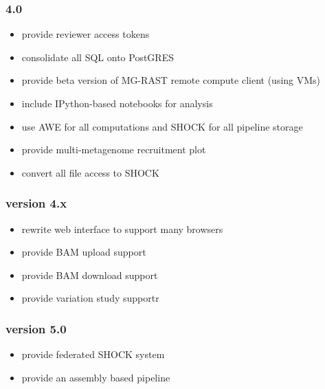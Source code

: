 \documentclass[12pt,fullpage]{report}
\begin{document}
\subsubsection*{4.0}
\begin{itemize}
\item provide reviewer access tokens
\item consolidate all SQL onto PostGRES
\item provide beta version of MG-RAST remote compute client (using VMs)
\item include IPython-based notebooks for analysis
\item use AWE for all computations and SHOCK for all pipeline storage
\item provide multi-metagenome recruitment plot
\item convert all file access to SHOCK
\end{itemize}
\subsubsection*{version 4.x}
\begin{itemize}
\item rewrite web interface to support many browsers
\item provide BAM upload support
\item provide BAM download support
\item provide variation study supportr
\end{itemize}
\subsubsection*{version 5.0}
\begin{itemize}
\item provide federated SHOCK system 
\item provide an assembly based pipeline
\end{itemize}



\end{document}
